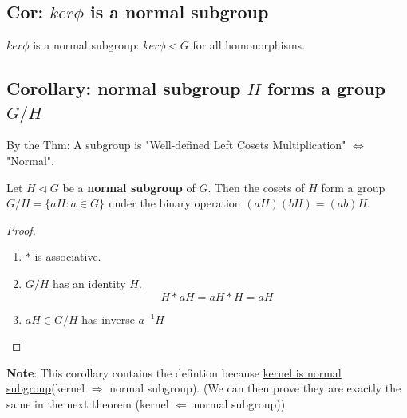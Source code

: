 \documentclass[11pt]{elegantbook}
\begin{document}
\subsection{Cor: $ker\phi$ is a normal subgroup}
\begin{corollary}
    $ker\phi$ is a normal subgroup: $ker\phi \lhd G$ for all homonorphisms.
\end{corollary}


\subsection{Corollary: normal subgroup $H$ forms a group $G/H$}
By the Thm: A subgroup is "Well-defined Left Cosets Multiplication" $\Leftrightarrow$ "Normal".
\begin{corollary}
    Let $H\lhd  G$ be a \textbf{normal subgroup} of $G$. Then the cosets of $H$ form a group $G/H=\{aH:a\in G\}$ under the
    binary operation $(aH)(bH) = (ab)H$.
\end{corollary}
\begin{proof}
\quad

\begin{enumerate}[$(1)$]
    \item $*$ is associative.
    \item $G/H$ has an identity $H$. $$H*aH=aH*H=aH$$
    \item $aH\in G/H$ has inverse $a^{-1}H$
\end{enumerate}
\end{proof}
\textbf{Note}: This corollary contains the defintion because \underline{kernel is normal subgroup}(kernel $\Rightarrow$ normal subgroup). (We can then prove they are exactly the same in the next theorem (kernel $\Leftarrow$ normal subgroup))
\end{document}
